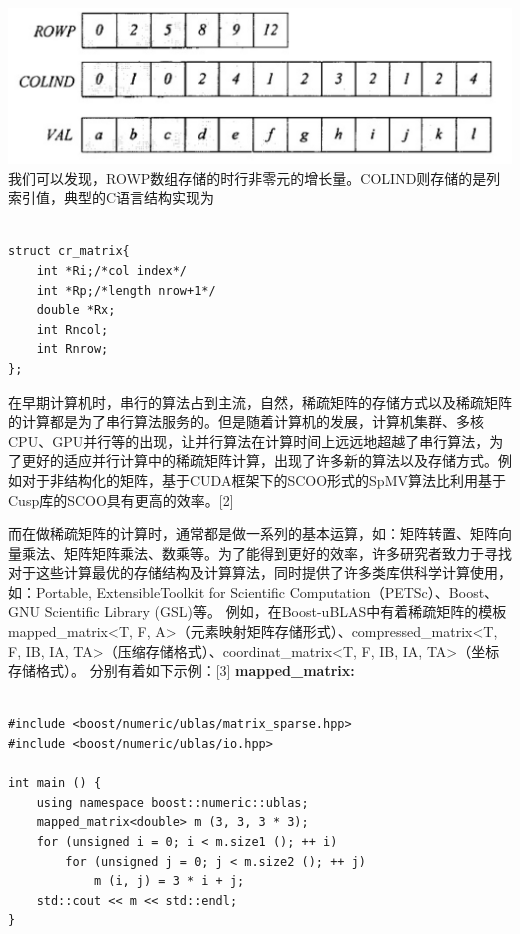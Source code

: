 \documentclass{article}
\begin{document}
\includegraphics[scale=0.25]{crs.png} \newline
我们可以发现，ROWP数组存储的时行非零元的增长量。COLIND则存储的是列索引值，典型的C语言结构实现为\newline
\begin{lstlisting}

struct cr_matrix{ 
	int *Ri;/*col index*/ 
	int *Rp;/*length nrow+1*/ 
	double *Rx; 
	int Rncol;
	int Rnrow;
};

\end{lstlisting}
在早期计算机时，串行的算法占到主流，自然，稀疏矩阵的存储方式以及稀疏矩阵的计算都是为了串行算法服务的。但是随着计算机的发展，计算机集群、多核CPU、GPU并行等的出现，让并行算法在计算时间上远远地超越了串行算法，为了更好的适应并行计算中的稀疏矩阵计算，出现了许多新的算法以及存储方式。例如对于非结构化的矩阵，基于CUDA框架下的SCOO形式的SpMV算法比利用基于Cusp库的SCOO具有更高的效率。[2]
\newline

而在做稀疏矩阵的计算时，通常都是做一系列的基本运算，如：矩阵转置、矩阵向量乘法、矩阵矩阵乘法、数乘等。为了能得到更好的效率，许多研究者致力于寻找对于这些计算最优的存储结构及计算算法，同时提供了许多类库供科学计算使用，如：Portable, ExtensibleToolkit for Scientific Computation（PETSc）、Boost、GNU Scientific Library (GSL)等。\newline
例如，在Boost-uBLAS中有着稀疏矩阵的模板mapped\_matrix<T, F, A>（元素映射矩阵存储形式）、compressed\_matrix<T, F, IB, IA, TA>（压缩存储格式）、coordinat\_matrix<T, F, IB, IA, TA>（坐标存储格式）。
分别有着如下示例：[3]\newline
\textbf{mapped\_matrix:}
\begin{lstlisting}

#include <boost/numeric/ublas/matrix_sparse.hpp>
#include <boost/numeric/ublas/io.hpp>

int main () {
    using namespace boost::numeric::ublas;
    mapped_matrix<double> m (3, 3, 3 * 3);
    for (unsigned i = 0; i < m.size1 (); ++ i)
        for (unsigned j = 0; j < m.size2 (); ++ j)
            m (i, j) = 3 * i + j;
    std::cout << m << std::endl;
}

\end{lstlisting}
\end{document}
